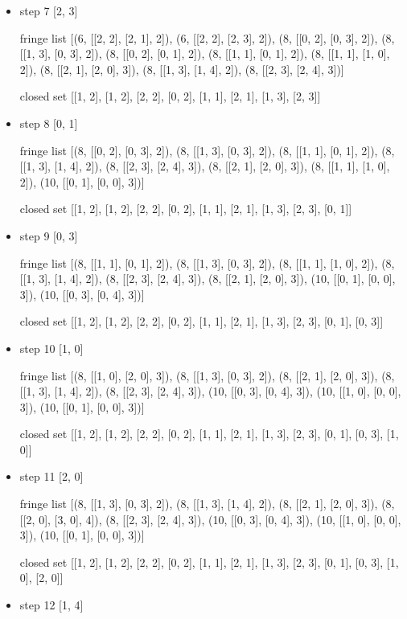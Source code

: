 \documentclass[aps,letterpaper,10pt]{revtex4}
\begin{document}
\begin{itemize}
\item step 7
[2, 3]


fringe list
[(6, [[2, 2], [2, 1], 2]), (6, [[2, 2], [2, 3], 2]), (8, [[0, 2], [0, 3], 2]), (8, [[1, 3], [0, 3], 2]), (8, [[0, 2], [0, 1], 2]), (8, [[1, 1], [0, 1], 2]), (8, [[1, 1], 
[1, 0], 2]), (8, [[2, 1], [2, 0], 3]), (8, [[1, 3], [1, 4], 2]), (8, [[2, 3], [2, 4], 3])]


closed set
[[1, 2], [1, 2], [2, 2], [0, 2], [1, 1], [2, 1], [1, 3], [2, 3]]


\item step 8
[0, 1]


fringe list
[(8, [[0, 2], [0, 3], 2]), (8, [[1, 3], [0, 3], 2]), (8, [[1, 1], [0, 1], 2]), (8, [[1, 3], [1, 4], 2]), (8, [[2, 3], [2, 4], 3]), (8, [[2, 1], [2, 0], 3]), (8, [[1, 1], 
[1, 0], 2]), (10, [[0, 1], [0, 0], 3])]


closed set
[[1, 2], [1, 2], [2, 2], [0, 2], [1, 1], [2, 1], [1, 3], [2, 3], [0, 1]]


\item step 9
[0, 3]


fringe list
[(8, [[1, 1], [0, 1], 2]), (8, [[1, 3], [0, 3], 2]), (8, [[1, 1], [1, 0], 2]), (8, [[1, 3], [1, 4], 2]), (8, [[2, 3], [2, 4], 3]), (8, [[2, 1], [2, 0], 3]), (10, [[0, 1], [0, 0], 3]), (10, [[0, 3], [0, 4], 3])]


closed set
[[1, 2], [1, 2], [2, 2], [0, 2], [1, 1], [2, 1], [1, 3], [2, 3], [0, 1], [0, 3]]


\item step 10
[1, 0]


fringe list
[(8, [[1, 0], [2, 0], 3]), (8, [[1, 3], [0, 3], 2]), (8, [[2, 1], [2, 0], 3]), (8, [[1, 3], [1, 4], 2]), (8, [[2, 3], [2, 4], 3]), (10, [[0, 3], [0, 4], 3]), (10, [[1, 0], [0, 0], 3]), (10, [[0, 1], [0, 0], 3])]


closed set
[[1, 2], [1, 2], [2, 2], [0, 2], [1, 1], [2, 1], [1, 3], [2, 3], [0, 1], [0, 3], [1, 0]]


\item step 11
[2, 0]


fringe list
[(8, [[1, 3], [0, 3], 2]), (8, [[1, 3], [1, 4], 2]), (8, [[2, 1], [2, 0], 3]), (8, [[2, 0], [3, 0], 4]), (8, [[2, 3], [2, 4], 3]), (10, [[0, 3], [0, 4], 3]), (10, [[1, 0], [0, 0], 3]), (10, [[0, 1], [0, 0], 3])]


closed set
[[1, 2], [1, 2], [2, 2], [0, 2], [1, 1], [2, 1], [1, 3], [2, 3], [0, 1], [0, 3], [1, 0], [2, 0]]


\item step 12
[1, 4]



\end{itemize}
\end{document}
